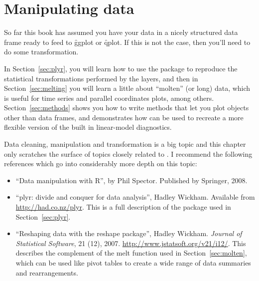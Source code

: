 

% 


\chapter{Manipulating data}
\label{cha:data}

So far this book has assumed you have your data in a nicely structured data frame ready to feed to \f{ggplot} or \f{qplot}. If this is not the case, then you'll need to do some transformation.  

In Section~\ref{sec:plyr}, you will learn how to use the  package to reproduce the statistical transformations performed by the layers, and then in Section~\ref{sec:melting} you will learn a little about ``molten'' (or long) data, which is useful for time series and parallel coordinates plots, among others.  Section~\ref{sec:methods} shows you how to write methods that let you plot objects other than data frames, and demonstrates how \ggplot can be used to recreate a more flexible version of the built in linear-model diagnostics.  

Data cleaning, manipulation and transformation is a big topic and this chapter only scratches the surface of topics closely related to \ggplot.  I recommend the following references which go into considerably more depth on this topic:

\begin{itemize}
  \item ``Data manipulation with R'', by Phil Spector.  Published by Springer, 2008.
  
  \item ``plyr: divide and conquer for data analysis'', Hadley Wickham.  Available from \url{http://had.co.nz/plyr}.  This is a full description of the package used in Section~\ref{sec:plyr}.

  \item ``Reshaping data with the reshape package'', Hadley Wickham. \emph{Journal of Statistical Software}, 21 (12), 2007. \url{http://www.jstatsoft.org/v21/i12/}.  This describes the complement of the melt function used in Section~\ref{sec:molten}, which can be used like pivot tables to create a wide range of data summaries and rearrangements.
  
\end{itemize}

